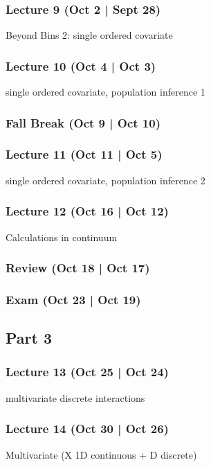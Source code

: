 \documentclass[12pt]{article}
\begin{document}
\subsubsection*{Lecture 9 (Oct 2 | Sept 28)}
Beyond Bins 2: single ordered covariate



\subsubsection*{Lecture 10 (Oct 4 | Oct 3)}
single ordered covariate, population inference 1



\subsubsection*{Fall Break (Oct 9 | Oct 10)}



\subsubsection*{Lecture 11 (Oct 11 | Oct 5)}
single ordered covariate, population inference 2



\subsubsection*{Lecture 12 (Oct 16 | Oct 12)}
Calculations in continuum



\subsubsection*{Review (Oct 18 | Oct 17)}

 

\subsubsection*{Exam (Oct 23 | Oct 19)}


\subsection*{Part 3}
\subsubsection*{Lecture 13 (Oct 25 | Oct 24)}
multivariate discrete interactions 


\subsubsection*{Lecture 14 (Oct 30 | Oct 26)}
Multivariate (X 1D continuous + D discrete)
\end{document}
